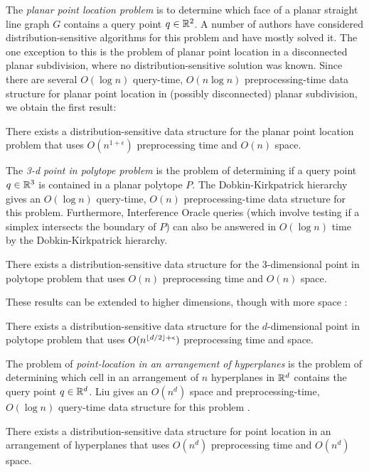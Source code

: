 \documentclass{patmorin}
\begin{document}
The \emph{planar point location problem} is to determine which face of a
planar straight line graph $G$ contains a query point $q\in\mathbb{R}^2$.  A number
of authors have considered distribution-sensitive algorithms for this
problem \cite{S} and have mostly solved it. The one exception to this is
the problem of planar point location in a disconnected planar subdivision,
where no distribution-sensitive solution was known.  Since there are
several $O(\log n)$ query-time, $O(n\log n)$ preprocessing-time data
structure for planar point location in (possibly disconnected) planar
subdivision, we obtain the first result:

\begin{thm}
  There exists a distribution-sensitive data structure for the planar
  point location problem that uses $O(n^{1+\epsilon})$ preprocessing
  time and $O(n)$ space.
\end{thm}

The \emph{3-d point in polytope problem} is the problem of determining
if a query point $q\in\mathbb{R}^3$ is contained in a planar polytope $P$.
The Dobkin-Kirkpatrick hierarchy \cite{X} gives an $O(\log n)$ query-time,
$O(n)$ preprocessing-time data structure for this problem.  Furthermore,
Interference Oracle queries (which involve testing if a simplex intersects
the boundary of $P$) can also be answered in $O(\log n)$ time by the
Dobkin-Kirkpatrick hierarchy.

\begin{thm}
  There exists a distribution-sensitive data structure for the
  3-dimensional point in polytope problem that uses $O(n)$ preprocessing
  time and $O(n)$ space.
\end{thm}

These results can be extended to higher dimensions, though with more space \cite{c88}:

\begin{thm}
  There exists a distribution-sensitive data structure for
  the $d$-dimensional point in polytope problem that uses
  $O(n^{{\left\lfloor d/2 \right\rfloor}+\epsilon})$ preprocessing time and space.
\end{thm}

The problem of \emph{point-location in an arrangement of hyperplanes} is
the problem of determining which cell in an arrangement of $n$ hyperplanes
in $\mathbb{R}^d$ contains the query point $q\in\mathbb{R}^d$.  Liu gives an $O(n^d)$
space and preprocessing-time, $O(\log n)$ query-time data structure for
this problem \cite{S}.

\begin{thm}
  There exists a distribution-sensitive data structure for point location
  in an arrangement of hyperplanes that uses $O(n^d)$ preprocessing time
  and $O(n^d)$ space.
\end{thm}
\end{document}
